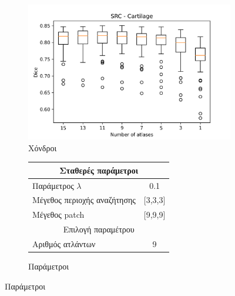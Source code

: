 \documentclass{beamer}
\begin{document}
\begin{frame}
\begin{figure}[H]
    \begin{subfigure}[b]{0.42\linewidth}
    \includegraphics[width=\linewidth]{SRC_Number_of_atlases_Cartilage_plot.png}
    \caption{Χόνδροι}
    \end{subfigure}
    \begin{subfigure}[b]{0.42\linewidth}
        \begin{tabular}[t]{|l|c|} 
            \multicolumn{2}{c}{\footnotesize Σταθερές παράμετροι} \\
            \hline
            \footnotesize Παράμετρος $\lambda$ & \footnotesize 0.1 \\
            \hline
            \footnotesize Μέγεθος περιοχής αναζήτησης & \footnotesize  [3,3,3] \\ 
            \hline
            \footnotesize Μέγεθος patch & \footnotesize [9,9,9] \\
            \hline
            \multicolumn{2}{c}{\footnotesize Επιλογή παραμέτρου} \\
            \hline
            \footnotesize Αριθμός ατλάντων & \footnotesize 9 \\ 
            \hline
        \end{tabular}
    \caption{Παράμετροι}
    \end{subfigure}
\end{figure}

\end{frame}
\end{document}
